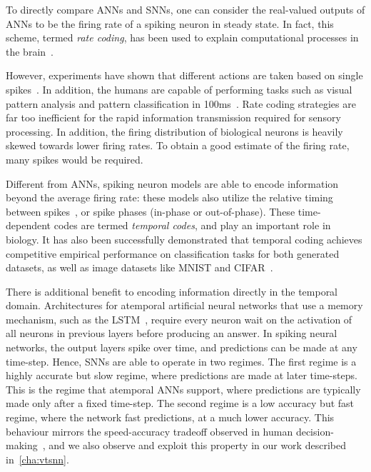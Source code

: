 \documentclass[fyp]{socreport}
\begin{document}
To directly compare ANNs and SNNs, one can consider the real-valued outputs of
ANNs to be the firing rate of a spiking neuron in steady state. In fact, this
scheme, termed \emph{rate coding}, has been used to explain computational
processes in the brain~\cite{pfeiffer2018deep}.

However, experiments have shown that different actions are taken based on single
spikes~\cite{stemmler96_singl_spike_suffic}. In addition, the humans are capable
of performing tasks such as visual pattern analysis and pattern classification
in 100ms~\cite{thorpe2001spike}. Rate coding strategies are far too inefficient
for the rapid information transmission required for sensory processing. In
addition, the firing distribution of biological neurons is heavily skewed
towards lower firing rates. To obtain a good estimate of the firing rate, many
spikes would be required.

Different from ANNs, spiking neuron models are able to encode information beyond
the average firing rate: these models also utilize the relative timing between
spikes~\cite{guetig14_to_spike_or_when_to_spike}, or spike phases (in-phase or
out-of-phase). These time-dependent codes are termed \emph{temporal codes}, and
play an important role in biology. It has also been successfully demonstrated
that temporal coding achieves competitive empirical performance on
classification tasks for both generated datasets, as well as image datasets like
MNIST and CIFAR~\cite{comsa19_tempor_codin_spikin_neural_networ}.

There is additional benefit to encoding information directly in the temporal
domain. Architectures for atemporal artificial neural networks that use a memory
mechanism, such as the LSTM~\cite{hochreiter1997long}, require every neuron wait
on the activation of all neurons in previous layers before producing an answer.
In spiking neural networks, the output layers spike over time, and predictions
can be made at any time-step. Hence, SNNs are able to operate in two regimes.
The first regime is a highly accurate but slow regime, where predictions are
made at later time-steps. This is the regime that atemporal ANNs support, where
predictions are typically made only after a fixed time-step. The second regime
is a low accuracy but fast regime, where the network fast predictions, at a much
lower accuracy. This behaviour mirrors the speed-accuracy tradeoff observed in
human decision-making~\cite{comsa19_tempor_codin_spikin_neural_networ}, and we
also observe and exploit this property in our work described
in~\autoref{cha:vtsnn}.
\end{document}
